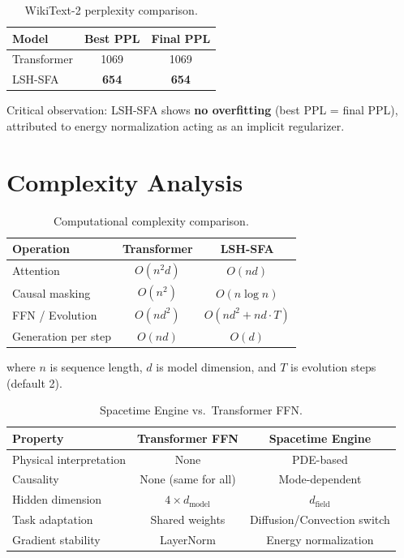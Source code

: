 \documentclass{article}
\begin{document}
\begin{table}[h]
\centering
\caption{WikiText-2 perplexity comparison.}
\label{tab:wikitext_results}
\begin{tabular}{lcc}
\toprule
\textbf{Model} & \textbf{Best PPL} & \textbf{Final PPL} \\
\midrule
Transformer & 1069 & 1069 \\
LSH-SFA & \textbf{654} & \textbf{654} \\
\bottomrule
\end{tabular}
\end{table}

Critical observation: LSH-SFA shows \textbf{no overfitting} (best PPL = final PPL), attributed to energy normalization acting as an implicit regularizer.

\section{Complexity Analysis}

\begin{table}[h]
\centering
\caption{Computational complexity comparison.}
\label{tab:complexity}
\begin{tabular}{lcc}
\toprule
\textbf{Operation} & \textbf{Transformer} & \textbf{LSH-SFA} \\
\midrule
Attention & $O(n^2 d)$ & $O(n d)$ \\
Causal masking & $O(n^2)$ & $O(n \log n)$ \\
FFN / Evolution & $O(n d^2)$ & $O(n d^2 + n d \cdot T)$ \\
Generation per step & $O(n d)$ & $O(d)$ \\
\bottomrule
\end{tabular}
\end{table}

where $n$ is sequence length, $d$ is model dimension, and $T$ is evolution steps (default 2).

\begin{table}[h]
\centering
\caption{Spacetime Engine vs.\ Transformer FFN.}
\label{tab:ffn_comparison}
\begin{tabular}{lcc}
\toprule
\textbf{Property} & \textbf{Transformer FFN} & \textbf{Spacetime Engine} \\
\midrule
Physical interpretation & None & PDE-based \\
Causality & None (same for all) & Mode-dependent \\
Hidden dimension & $4 \times d_{\text{model}}$ & $d_{\text{field}}$ \\
Task adaptation & Shared weights & Diffusion/Convection switch \\
Gradient stability & LayerNorm & Energy normalization \\
\bottomrule
\end{tabular}
\end{table}
\end{document}
